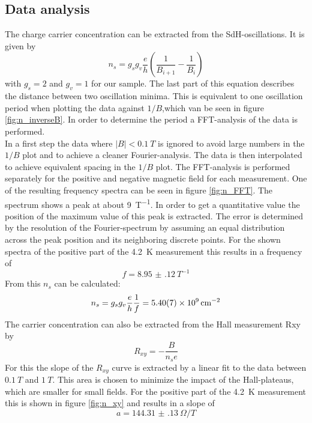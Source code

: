 \documentclass[12pt,a4paper]{article}
\begin{document}
\subsection{Data analysis}
The charge carrier concentration can be extracted from the SdH-oscillations. It is given by
\begin{equation}
n_s = g_s g_v \dfrac{e}{h} \left(\dfrac{1}{B_{i+1}} - \dfrac{1}{B_{i}}\right)
\end{equation}
with $g_s = 2$ and $g_v = 1$ for our sample. The last part of this equation describes the distance between two oscillation minima. This is equivalent to one oscillation period when plotting the data against $1/B$,which van be seen in figure \ref{fig:n_inverseB}. In order to determine the period a FFT-analysis of the data is performed.\\
In a first step the data where $|B| < \SI{0.1}{T}$ is ignored to avoid large numbers in the $1/B$ plot and to achieve a cleaner Fourier-analysis. The data is then interpolated to achieve equivalent spacing in the $1/B$ plot. The FFT-analysis is performed separately for the positive and negative magnetic field for each measurement. One of the resulting frequency spectra can be seen in figure \ref{fig:n_FFT}. The spectrum shows a peak at about \SI{9}{T^{-1}}. In order to get a quantitative value the position of the maximum value of this peak is extracted. The error is determined by the resolution of the Fourier-spectrum by assuming an equal distribution across the peak position and its neighboring discrete points. For the shown spectra of the positive part of the \SI{4.2}{K} measurement this results in a frequency of
\begin{equation*}
f = \SI{8.95(12)}{T^{-1}}
\end{equation*}
From this $n_s$ can be calculated:
\begin{equation}
n_s = g_s g_v \dfrac{e}{h} \dfrac{1}{f} = \SI{5.40(7)E9}{cm^{-2}}
\end{equation}
The carrier concentration can also be extracted from the Hall measurement Rxy by
\begin{equation}
R_{xy} = - \dfrac{B}{n_s e}
\end{equation}
For this the slope of the $R_{xy}$ curve is extracted by a linear fit to the data between $\SI{0.1}{T}$ and $\SI{1}{T}$. This area is chosen to minimize the impact of the Hall-plateaus, which are smaller for small fields. For the positive part of the \SI{4.2}{K} measurement this is shown in figure \ref{fig:n_xy} and results in a slope of
\begin{equation}
a = \SI{144.31(13)}{\Omega/T}
\end{equation}
\end{document}
